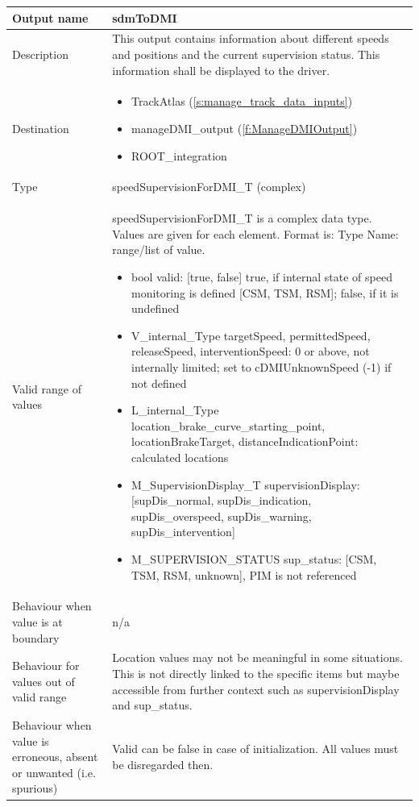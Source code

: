 \begin{longtable}{p{}p{}}
\toprule
Output name				& sdmToDMI \\
\midrule
Description				& This output contains information about different speeds and positions and the current supervision status. This information shall be displayed to the driver. \\
\midrule
Destination				& 
\begin{itemize}
\item TrackAtlas (\ref{s:manage_track_data_inputs})
\item manageDMI\_output (\ref{f:ManageDMIOutput})
\item ROOT\_integration 
\end{itemize} \\
\midrule
Type					& speedSupervisionForDMI\_T (complex)\\
\midrule
Valid range of values	& speedSupervisionForDMI\_T is a complex data type. Values are given for each element. Format is: Type Name: range/list of value.
\begin{itemize}
\item bool valid: [true, false] true, if internal state of speed monitoring is defined [CSM, TSM, RSM]; false, if it is undefined
\item V\_internal\_Type targetSpeed, permittedSpeed, releaseSpeed, interventionSpeed: 0 or above, not internally limited; set to cDMIUnknownSpeed (-1) if not defined
\item L\_internal\_Type location\_brake\_curve\_starting\_point, locationBrakeTarget, distanceIndicationPoint: calculated locations
\item M\_SupervisionDisplay\_T supervisionDisplay: [supDis\_normal, supDis\_indication, supDis\_overspeed, supDis\_warning, supDis\_intervention]
\item M\_SUPERVISION\_STATUS sup\_status: [CSM, TSM, RSM, unknown], PIM is not referenced
\end{itemize}\\
\midrule
Behaviour when value is at boundary	& n/a \\
\midrule
Behaviour for values out of valid range	& Location values may not be meaningful in some situations. This is not directly linked to the specific items but maybe accessible from further context such as supervisionDisplay and sup\_status.  \\
\midrule
Behaviour when value is erroneous, absent or unwanted (i.e. spurious) & Valid can be false in case of initialization. All values must be disregarded then. \\
\bottomrule
\end{longtable}


